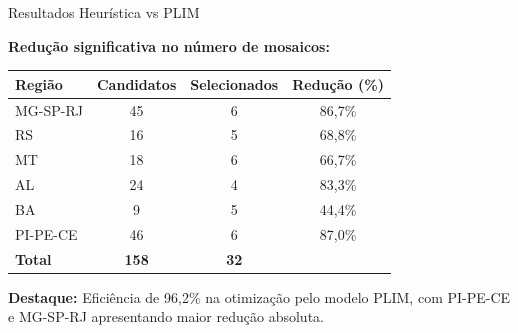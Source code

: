 \documentclass[aspectratio=169,11pt]{beamer}
\begin{document}
\begin{frame}{Resultados Heurística vs PLIM}
\vspace{-0.2cm}
\begin{center}
\textbf{Redução significativa no número de mosaicos:}
\end{center}

\begin{center}
\begin{tabular}{lccc}
\toprule
\textbf{Região} & \textbf{Candidatos} & \textbf{Selecionados} & \textbf{Redução (\%)} \\
\midrule
MG-SP-RJ    & 45 & 6 & 86,7\% \\
RS          & 16 & 5 & 68,8\% \\
MT          & 18 & 6 & 66,7\% \\
AL          & 24 & 4 & 83,3\% \\
BA          & 9  & 5 & 44,4\% \\
PI-PE-CE    & 46 & 6 & 87,0\% \\
\midrule
\textbf{Total} & \textbf{158} & \textbf{32} & \\
\bottomrule
\end{tabular}
\end{center}

\vspace{0.3cm}
\footnotesize
\textbf{Destaque:} Eficiência de 96,2\% na otimização pelo modelo PLIM, com PI-PE-CE e MG-SP-RJ apresentando maior redução absoluta\@.
\end{frame}
\end{document}
